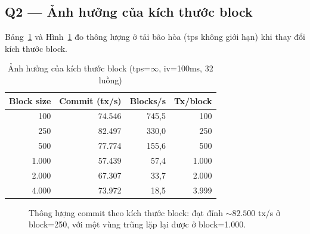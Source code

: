 \subsection{Q2 --- Ảnh hưởng của kích thước block}
\label{sec:eval-blocksize}

Bảng~\ref{tab:eval-blocksize} và Hình~\ref{fig:eval-blocksize} đo thông lượng ở
tải bão hòa (tps không giới hạn) khi thay đổi kích thước block.

\begin{table}[H]
\centering
\caption{Ảnh hưởng của kích thước block (tps=$\infty$, iv=100ms, 32 luồng)}
\label{tab:eval-blocksize}
\begin{tabular}{@{}rrrr@{}}
\toprule
\textbf{Block size} & \textbf{Commit (tx/s)} & \textbf{Blocks/s} & \textbf{Tx/block} \\
\midrule
100  & 74.546 & 745,5 & 100 \\
250  & 82.497 & 330,0 & 250 \\
500  & 77.774 & 155,6 & 500 \\
1.000 & 57.439 & 57,4 & 1.000 \\
2.000 & 67.307 & 33,7 & 2.000 \\
4.000 & 73.972 & 18,5 & 3.999 \\
\bottomrule
\end{tabular}
\end{table}

\begin{figure}[H]
\centering
{}
\caption{Thông lượng commit theo kích thước block: đạt đỉnh ${\sim}82.500$ tx/s ở
block=250, với một vùng trũng lặp lại được ở block=1.000.}
\label{fig:eval-blocksize}
\end{figure}

